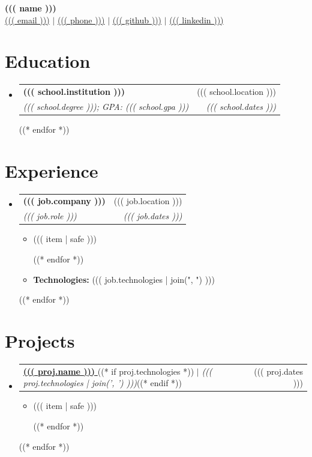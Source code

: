 \documentclass[letterpaper,11pt]{article}
\makeatletter
\newcommand{\resumeItem}[1]{
  \item\small{
    {#1 \vspace{-2pt}}
  }
}
\newcommand{\resumeSubheading}[4]{
  \vspace{-2pt}\item
    \begin{tabular*}{0.97\textwidth}[t]{l@{\extracolsep{\fill}}r}
      \textbf{#1} & #2 \\
      \textit{\small#3} & \textit{\small #4} \\
    \end{tabular*}\vspace{-7pt}
}
\newcommand{\resumeSubHeadingListStart}{\begin{itemize}[leftmargin=0.15in, label={}]}
\newcommand{\resumeSubHeadingListEnd}{\end{itemize}}
\newcommand{\resumeItemListStart}{\begin{itemize}}
\newcommand{\resumeItemListEnd}{\end{itemize}\vspace{-5pt}}
\newcommand{\technologies}[1]{
\noindent\textbf{Technologies:} #1
}
\newcommand{\resumeProjectHeading}[2]{
    \item
    \begin{tabular*}{0.97\textwidth}{l@{\extracolsep{\fill}}r}
      \small#1 & #2 \\
    \end{tabular*}\vspace{-7pt}
}
\makeatother
\begin{document}
\begin{center}
    {\LARGE \textbf{((( name )))}} \\[4pt]
    \normalsize
    \href{mailto:((( email )))}{((( email )))} $|$ 
    \href{tel:((( phone )))}{((( phone )))} $|$ 
    \href{((( "https://www." + github )))}{((( github )))} $|$ 
    \href{((( "https://www." + linkedin )))}{((( linkedin )))}

\end{center}

\section{Education}
  \resumeSubHeadingListStart
  ((* for school in education *))
    \resumeSubheading
      { ((( school.institution ))) }{ ((( school.location ))) }
      { ((( school.degree ))); GPA: ((( school.gpa ))) }{ ((( school.dates ))) }
    ((* endfor *))
  \resumeSubHeadingListEnd

\section{Experience}
  \resumeSubHeadingListStart
  ((* for job in work *))
    \resumeSubheading
      { ((( job.company ))) }{ ((( job.location ))) }
      { ((( job.role ))) }{ ((( job.dates ))) }
      \resumeItemListStart
      ((* for item in job.achievements *))
            \resumeItem{ ((( item | safe ))) }
      ((* endfor *))
      \resumeItem{ \technologies{((( job.technologies | join(", ") ))) } }
      \resumeItemListEnd
  ((* endfor *))
\resumeSubHeadingListEnd


\section{Projects}
\resumeSubHeadingListStart
((* for proj in projects *))
  \resumeProjectHeading
    {\href{ ((( proj.link ))) }{ \textbf{((( proj.name ))) } }((* if proj.technologies *)) $|$ \emph{((( proj.technologies | join(', ') )))}((* endif *))}
    {((( proj.dates )))}
  \resumeItemListStart
    ((* for item in proj.description *))
    \resumeItem{((( item | safe )))}
    ((* endfor *))
  \resumeItemListEnd
((* endfor *))
\resumeSubHeadingListEnd
\end{document}
